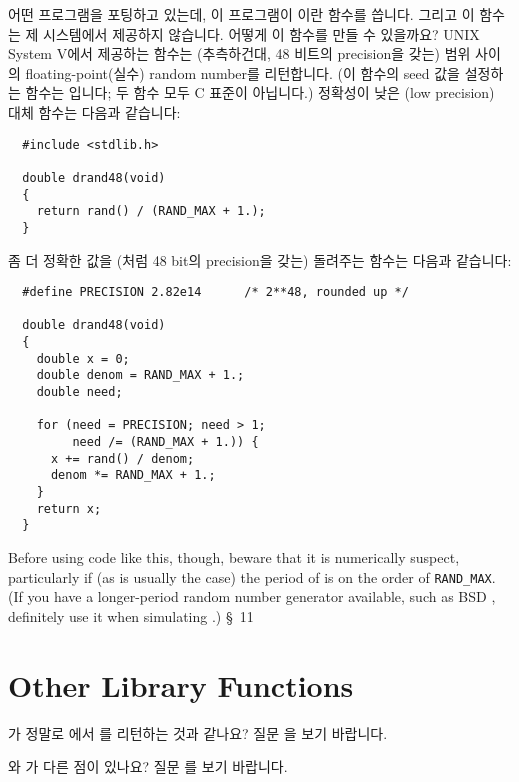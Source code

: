 \begin{faq}
	어떤 프로그램을 포팅하고 있는데, 이 프로그램이 이란 함수를
        씁니다. 그리고 이 함수는 제 시스템에서 제공하지 않습니다. 어떻게 이
        함수를 만들 수 있을까요?
\A
	UNIX System V에서 제공하는  함수는
        (추측하건대, 48 비트의 precision을 갖는) 범위 \TT{[0, 1)} 사이의
        floating-point(실수) random number를 리턴합니다. (이 함수의 seed 값을
        설정하는 함수는 입니다; 두 함수 모두 C 표준이 아닙니다.)
        정확성이 낮은 (low precision) 대체 함수는 다음과 같습니다:
\begin{verbatim}
  #include <stdlib.h>

  double drand48(void)
  {
    return rand() / (RAND_MAX + 1.);
  }
\end{verbatim}

	좀 더 정확한 값을 (처럼 48 bit의 precision을 갖는) 돌려주는
        함수는 다음과 같습니다:
\begin{verbatim}
  #define PRECISION 2.82e14      /* 2**48, rounded up */

  double drand48(void)
  {
    double x = 0;
    double denom = RAND_MAX + 1.;
    double need;

    for (need = PRECISION; need > 1;
         need /= (RAND_MAX + 1.)) {
      x += rand() / denom;
      denom *= RAND_MAX + 1.;
    }
    return x;
  }
\end{verbatim}
	Before using code like this, though, beware that it is numerically
        suspect, particularly if (as is usually the case) the period of
         is on the order of \verb+RAND_MAX+. (If you have a
        longer-period random number generator available, such as BSD
        , definitely use it when simulating .)
\R
	\cite{pcs} \S\ 11 
\end{faq}
        
\section{Other Library Functions}
\begin{faq}
	가 정말로 에서 를 리턴하는 것과
        같나요?
\A
	질문 을 보기 바랍니다.
\end{faq}

\begin{faq}
	와 가 다른 점이 있나요?
\A
	질문 를 보기 바랍니다.
\end{faq}


